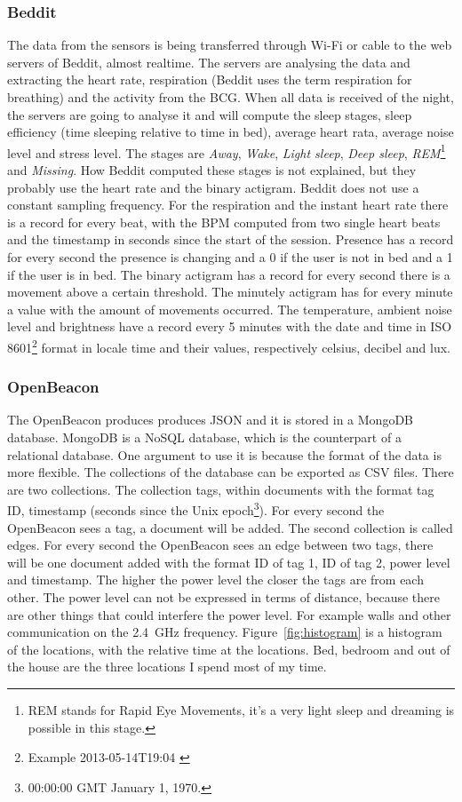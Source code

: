 		\subsubsection{Beddit}
		\label{sec:datadescriptionbeddit}
		The data from the sensors is being transferred through Wi-Fi or cable to the web servers of Beddit, almost realtime. The servers are analysing the data and extracting the heart rate, respiration (Beddit uses the term respiration for breathing) and the activity from the BCG. When all data is received of the night, the servers are going to analyse it and will compute the sleep stages, sleep efficiency (time sleeping relative to time in bed), average heart rata, average noise level and stress level. The stages are \emph{Away}, \emph{Wake}, \emph{Light sleep}, \emph{Deep sleep}, \emph{REM}\footnote{REM stands for Rapid Eye Movements, it's a very light sleep and dreaming is possible in this stage.} and \emph{Missing}. How Beddit computed these stages is not explained, but they probably use the heart rate and the binary actigram. Beddit does not use a constant sampling frequency. For the respiration and the instant heart rate there is a record for every beat, with the BPM computed from two single heart beats and the timestamp in seconds since the start of the session. Presence has a record for every second the presence is changing and a 0 if the user is not in bed and a 1 if the user is in bed. The binary actigram has a record for every second there is a movement above a certain threshold. The minutely actigram has for every minute a value with the amount of movements occurred. The temperature, ambient noise level and brightness have a record every 5 minutes with the date and time in ISO 8601\footnote{Example 2013-05-14T19:04 \cite{iso8601}} format in locale time and their values, respectively celsius, decibel and lux.

		\subsubsection{OpenBeacon}
			The OpenBeacon produces produces JSON and it is stored in a MongoDB database. MongoDB is a NoSQL database, which is the counterpart of a relational database. One argument to use it is because the format of the data is more flexible. The collections of the database can be exported as CSV files.
			There are two collections. The collection tags, within documents with the format tag ID, timestamp (seconds since the Unix epoch\footnote{00:00:00 GMT January 1, 1970.}). For every second the OpenBeacon sees a tag, a document will be added.
			The second collection is called edges. For every second the OpenBeacon sees an edge between two tags, there will be one document added with the format ID of tag 1, ID of tag 2, power level and timestamp.
			The higher the power level the closer the tags are from each other. The power level can not be expressed in terms of distance, because there are other things that could interfere the power level. For example walls and other communication on the \SI{2.4}{\giga\hertz} frequency. Figure~\ref{fig:histogram} is a histogram of the locations, with the relative time at the locations. Bed, bedroom and out of the house are the three locations I spend most of my time. 

